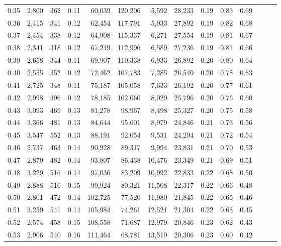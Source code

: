 \begin{tabular}{rrrrrrrrrrrrrr}
0.35 &  2,800 &  362 &  0.11 &   60,039 &  120,206 &   5,592 &  28,233 &  0.19 &  0.83 &      0.69 \\
0.36 &  2,415 &  341 &  0.12 &   62,454 &  117,791 &   5,933 &  27,892 &  0.19 &  0.82 &      0.68 \\
0.37 &  2,454 &  338 &  0.12 &   64,908 &  115,337 &   6,271 &  27,554 &  0.19 &  0.81 &      0.67 \\
0.38 &  2,341 &  318 &  0.12 &   67,249 &  112,996 &   6,589 &  27,236 &  0.19 &  0.81 &      0.66 \\
0.39 &  2,658 &  344 &  0.11 &   69,907 &  110,338 &   6,933 &  26,892 &  0.20 &  0.80 &      0.64 \\
0.40 &  2,555 &  352 &  0.12 &   72,462 &  107,783 &   7,285 &  26,540 &  0.20 &  0.78 &      0.63 \\
0.41 &  2,725 &  348 &  0.11 &   75,187 &  105,058 &   7,633 &  26,192 &  0.20 &  0.77 &      0.61 \\
0.42 &  2,998 &  396 &  0.12 &   78,185 &  102,060 &   8,029 &  25,796 &  0.20 &  0.76 &      0.60 \\
0.43 &  3,093 &  469 &  0.13 &   81,278 &   98,967 &   8,498 &  25,327 &  0.20 &  0.75 &      0.58 \\
0.44 &  3,366 &  481 &  0.13 &   84,644 &   95,601 &   8,979 &  24,846 &  0.21 &  0.73 &      0.56 \\
0.45 &  3,547 &  552 &  0.13 &   88,191 &   92,054 &   9,531 &  24,294 &  0.21 &  0.72 &      0.54 \\
0.46 &  2,737 &  463 &  0.14 &   90,928 &   89,317 &   9,994 &  23,831 &  0.21 &  0.70 &      0.53 \\
0.47 &  2,879 &  482 &  0.14 &   93,807 &   86,438 &  10,476 &  23,349 &  0.21 &  0.69 &      0.51 \\
0.48 &  3,229 &  516 &  0.14 &   97,036 &   83,209 &  10,992 &  22,833 &  0.22 &  0.68 &      0.50 \\
0.49 &  2,888 &  516 &  0.15 &   99,924 &   80,321 &  11,508 &  22,317 &  0.22 &  0.66 &      0.48 \\
0.50 &  2,801 &  472 &  0.14 &  102,725 &   77,520 &  11,980 &  21,845 &  0.22 &  0.65 &      0.46 \\
0.51 &  3,259 &  541 &  0.14 &  105,984 &   74,261 &  12,521 &  21,304 &  0.22 &  0.63 &      0.45 \\
0.52 &  2,574 &  458 &  0.15 &  108,558 &   71,687 &  12,979 &  20,846 &  0.23 &  0.62 &      0.43 \\
0.53 &  2,906 &  540 &  0.16 &  111,464 &   68,781 &  13,519 &  20,306 &  0.23 &  0.60 &      0.42 \\

\end{tabular}
